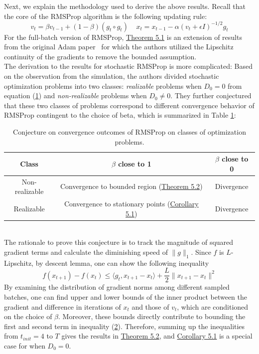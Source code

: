 \documentclass{article}
\begin{document}
Next, we explain the methodology used to derive the above results. Recall that the core of the RMSProp algorithm is the following updating rule:
\[
v_t = \beta v_{t - 1} + (1 - \beta)(g_t \circ g_t)\ \  \ \ \ x_t = x_{t - 1} - \alpha(v_t + \epsilon I)^{-1/2}g_t
\] 
For the full-batch version of RMSProp, \hyperref[theom51]{Theorem 5.1} is an extension of results from the original Adam paper~\cite{Gower2021StochasticQM} for which the authors utilized the Lipschitz continuity of the gradients to remove the bounded assumption.\\
\newline
The derivation to the results for stochastic RMSProp is more complicated: Based on the observation from the simulation, the authors divided stochastic optimization problems into two classes: \textit{realizable} problems when $D_0 = 0$ from equation (\hyperref[eq51]{1}) and  \textit{non-realizable} problems when $D_0 \neq 0$. They further conjectured that these two classes of problems correspond to different convergence behavior of RMSProp contingent to the choice of beta, which is summarized in Table \hyperref[tb1]{1}:
\begin{table}[h]
\label{tb1}
\centering
\begin{tabular}{c|c | c}
	\hline
	Class & $\beta$ close to 1 & $\beta$ close to 0\\
	\hline
	Non-realizable & Convergence to bounded region (\hyperref[theom51]{Theorem 5.2}) & Divergence\\
	Realizable & Convergence to stationary points (\hyperref[coro51]{Corollary 5.1}) & Divergence\\
	\hline
\end{tabular}
\vspace{3pt}
\caption{Conjecture on convergence outcomes of RMSProp on classes of optimization problems.}
\end{table}
\ \\
The rationale to prove this conjecture is to track the magnitude of squared gradient terms and calculate the diminishing speed of $\|g\|_1$. Since $f$ is $L$-Lipschitz, by descent lemma, one can show the following inequality
\begin{equation}
\label{eq52}
f(x_{t + 1}) - f(x_{t}) \leq \langle g_t, x_{t + 1} - x_{t}\rangle + \frac{L}{2}\|x_{t + 1} - x_{t}\|^2
\end{equation}
By examining the distribution of gradient norms among different sampled batches, one can find upper and lower bounds of the inner product between the gradient and difference in iterations of $x_t$ and those of $v_t$, which are conditioned on the choice of $\beta$. Moreover, these bounds directly contribute to bounding the first and second term in inequality  (\hyperref[eq52]{2}). Therefore, summing up the inequalities from $t_{init} = 4$ to $T$ gives the results in \hyperref[theom51]{Theorem 5.2}, and \hyperref[coro51]{Corollary 5.1} is a special case for when $D_0 = 0$.
\end{document}

